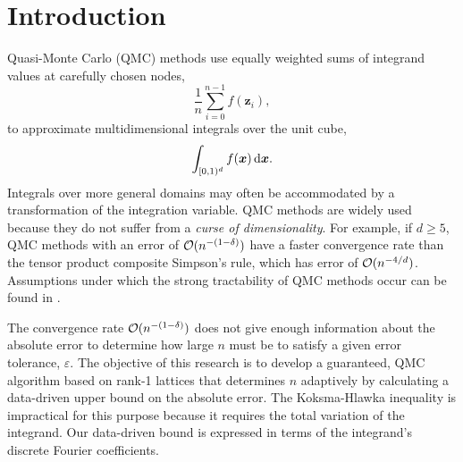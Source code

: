 \documentclass[graybox]{svmult}
\newcommand{\bsx}{\boldsymbol{x}}    %
\newcommand{\bsz}{\boldsymbol{z}}    %
\begin{document}

\section{Introduction}

Quasi-Monte Carlo (QMC) methods use equally weighted sums of integrand values at carefully chosen nodes,
\[
\frac 1n \sum_{i=0}^{n-1} f(\bsz_i), 
\]
to approximate multidimensional integrals over the unit cube,
\[
\int_{\cube} f(\bsx) \, \dif \bsx.
\]
Integrals over more general domains may often be accommodated by a transformation of the integration variable. QMC methods are widely used because they do not suffer from a \textit{curse of dimensionality}. For example, if $d \ge 5$, QMC methods with an error of $\mathcal{O}(n^{-(1-\delta)})$ have a faster convergence rate than the tensor product composite Simpson's rule, which has error of $\mathcal{O}(n^{-4/d})$. Assumptions under which the strong tractability of QMC methods occur can be found in \cite{HicWoz99}.

The convergence rate $\mathcal{O}(n^{-(1-\delta)})$ does not give enough information about the absolute error to determine how large $n$ must be to satisfy a given error tolerance, $\varepsilon$. The objective of this research is to develop a guaranteed, QMC algorithm based on rank-1 lattices that determines $n$ adaptively by calculating a data-driven upper bound on the absolute error. The Koksma-Hlawka inequality is impractical for this purpose because it requires the total variation of the integrand. Our data-driven bound is expressed in terms of the integrand's discrete Fourier coefficients. 
\end{document}
